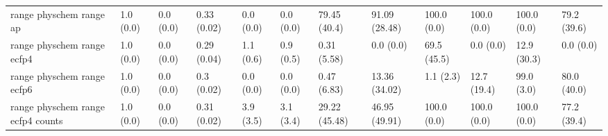 \begin{tabular}{llllllllllll}
range physchem range ap & {\cellcolor[HTML]{F6FCFD}} \color[HTML]{000000} 1.0 (0.0) & {\cellcolor[HTML]{F7FCFD}} \color[HTML]{000000} 0.0 (0.0) & {\cellcolor[HTML]{7CCBB4}} \color[HTML]{000000} 0.33 (0.02) & {\cellcolor[HTML]{F7FCFD}} \color[HTML]{000000} 0.0 (0.0) & {\cellcolor[HTML]{F7FCFD}} \color[HTML]{000000} 0.0 (0.0) & {\cellcolor[HTML]{16803C}} \color[HTML]{F1F1F1} 79.45 (40.4) & {\cellcolor[HTML]{006027}} \color[HTML]{F1F1F1} 91.09 (28.48) & {\cellcolor[HTML]{00441B}} \color[HTML]{F1F1F1} 100.0 (0.0) & {\cellcolor[HTML]{00441B}} \color[HTML]{F1F1F1} 100.0 (0.0) & {\cellcolor[HTML]{00441B}} \color[HTML]{F1F1F1} 100.0 (0.0) & {\cellcolor[HTML]{F7FCFD}} \color[HTML]{000000} 79.2 (39.6) \\
range physchem range ecfp4 & {\cellcolor[HTML]{F6FCFD}} \color[HTML]{000000} 1.0 (0.0) & {\cellcolor[HTML]{F7FCFD}} \color[HTML]{000000} 0.0 (0.0) & {\cellcolor[HTML]{9AD8CA}} \color[HTML]{000000} 0.29 (0.04) & {\cellcolor[HTML]{F7FCFD}} \color[HTML]{000000} 1.1 (0.6) & {\cellcolor[HTML]{F7FCFD}} \color[HTML]{000000} 0.9 (0.5) & {\cellcolor[HTML]{F7FCFD}} \color[HTML]{000000} 0.31 (5.58) & {\cellcolor[HTML]{F7FCFD}} \color[HTML]{000000} 0.0 (0.0) & {\cellcolor[HTML]{00441B}} \color[HTML]{F1F1F1} 69.5 (45.5) & {\cellcolor[HTML]{00441B}} \color[HTML]{F1F1F1} 0.0 (0.0) & {\cellcolor[HTML]{00441B}} \color[HTML]{F1F1F1} 12.9 (30.3) & {\cellcolor[HTML]{1D8640}} \color[HTML]{F1F1F1} 0.0 (0.0) \\
range physchem range ecfp6 & {\cellcolor[HTML]{F6FCFD}} \color[HTML]{000000} 1.0 (0.0) & {\cellcolor[HTML]{F7FCFD}} \color[HTML]{000000} 0.0 (0.0) & {\cellcolor[HTML]{82CEB8}} \color[HTML]{000000} 0.3 (0.02) & {\cellcolor[HTML]{F7FCFD}} \color[HTML]{000000} 0.0 (0.0) & {\cellcolor[HTML]{F7FCFD}} \color[HTML]{000000} 0.0 (0.0) & {\cellcolor[HTML]{F6FCFD}} \color[HTML]{000000} 0.47 (6.83) & {\cellcolor[HTML]{E3F4F8}} \color[HTML]{000000} 13.36 (34.02) & {\cellcolor[HTML]{00441B}} \color[HTML]{F1F1F1} 1.1 (2.3) & {\cellcolor[HTML]{00441B}} \color[HTML]{F1F1F1} 12.7 (19.4) & {\cellcolor[HTML]{00491D}} \color[HTML]{F1F1F1} 99.0 (3.0) & {\cellcolor[HTML]{D3EEEB}} \color[HTML]{000000} 80.0 (40.0) \\
range physchem range ecfp4 counts & {\cellcolor[HTML]{F6FCFD}} \color[HTML]{000000} 1.0 (0.0) & {\cellcolor[HTML]{F7FCFD}} \color[HTML]{000000} 0.0 (0.0) & {\cellcolor[HTML]{A8DED2}} \color[HTML]{000000} 0.31 (0.02) & {\cellcolor[HTML]{F7FCFD}} \color[HTML]{000000} 3.9 (3.5) & {\cellcolor[HTML]{F7FCFD}} \color[HTML]{000000} 3.1 (3.4) & {\cellcolor[HTML]{BCE6DD}} \color[HTML]{000000} 29.22 (45.48) & {\cellcolor[HTML]{72C7AD}} \color[HTML]{000000} 46.95 (49.91) & {\cellcolor[HTML]{00441B}} \color[HTML]{F1F1F1} 100.0 (0.0) & {\cellcolor[HTML]{00441B}} \color[HTML]{F1F1F1} 100.0 (0.0) & {\cellcolor[HTML]{00441B}} \color[HTML]{F1F1F1} 100.0 (0.0) & {\cellcolor[HTML]{17813D}} \color[HTML]{F1F1F1} 77.2 (39.4) \\

\end{tabular}
